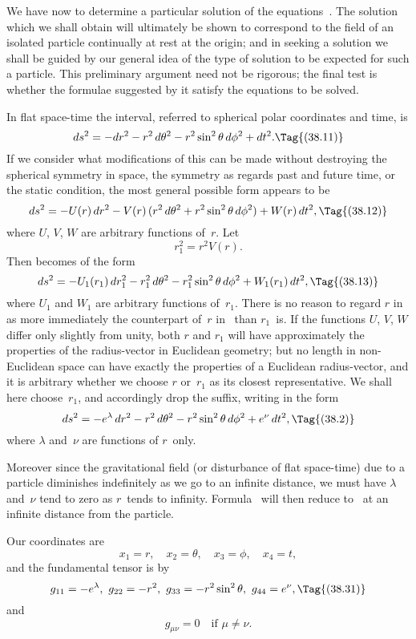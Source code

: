 \documentclass[12pt]{book}
\begin{document}
We have now to determine a particular solution of the equations~.
The solution which we shall obtain will ultimately be shown to correspond to
the field of an isolated particle continually at rest at the origin; and in seeking
a solution we shall be guided by our general idea of the type of solution to be
expected for such a particle. This preliminary argument need not be rigorous;
the final test is whether the formulae suggested by it satisfy the equations
to be solved.

In flat space-time the interval, referred to spherical polar coordinates and
time, is
\[
ds^{2} = -dr^{2} - r^{2}\, d\theta^2 - r^{2} \sin^{2}\theta\, d\phi^{2} + dt^{2}.
\Tag{(38.11)}
\]
If we consider what modifications of this can be made without destroying the
spherical symmetry in space, the symmetry as regards past and future time,
or the static condition, the most general possible form appears to be
\[
ds^{2} = -U(r)\, dr^{2} - V(r)\, (r^{2}\, d\theta^2 + r^{2} \sin^{2}\theta\, d\phi^{2}) + W(r)\, dt^{2},
\Tag{(38.12)}
\]
where $U$, $V$, $W$ are arbitrary functions of~$r$. Let
\[
r_{1}^{2} = r^{2} V(r).
\]
Then  becomes of the form
\[
ds^{2} = - U_{1}(r_{1})\, dr_{1}^{2} - r_{1}^{2}\, d\theta^2 - r_{1}^{2} \sin^{2}\theta\, d\phi^{2} + W_{1}(r_{1})\, dt^{2},
\Tag{(38.13)}
\]
where $U_{1}$ and $W_{1}$ are arbitrary functions of~$r_{1}$. There is no reason to regard
$r$ in~ as more immediately the counterpart of~$r$ in~ than $r_{1}$~is. If
the functions $U$, $V$, $W$ differ only slightly from unity, both $r$ and $r_{1}$ will have
approximately the properties of the radius\hyp{}vector in Euclidean geometry; but
no length in non\hyp{}Euclidean space can have exactly the properties of a Euclidean
radius\hyp{}vector, and it is arbitrary whether we choose $r$ or~$r_{1}$ as its closest representative.
We shall here choose~$r_{1}$, and accordingly drop the suffix, writing
 in the form
\[
ds^{2} = -e^{\lambda}\, dr^{2} - r^{2}\, d\theta^2 - r^{2} \sin^{2}\theta\, d\phi^{2} + e^{\nu}\, dt^{2},
\Tag{(38.2)}
\]
where $\lambda$ and~$\nu$ are functions of $r$~only.

Moreover since the gravitational field (or disturbance of flat space-time)
due to a particle diminishes indefinitely as we go to an infinite distance, we
must have $\lambda$ and~$\nu$ tend to zero as $r$~tends to infinity. Formula~ will
then reduce to~ at an infinite distance from the particle.

Our coordinates are
\[
x_{1} = r,\quad
x_{2} = \theta,\quad
x_{3} = \phi,\quad
x_{4} = t,
\]
and the fundamental tensor is by~
\[
g_{11} = -e^{\lambda},\
g_{22} = -r^{2},\
g_{33} = -r^{2} \sin^{2}\theta,\
g_{44} = e^{\nu},
\Tag{(38.31)}
\]
and
\[
g_{\mu\nu} = 0\quad\text{if $\mu \neq \nu$.}
\]
\end{document}
